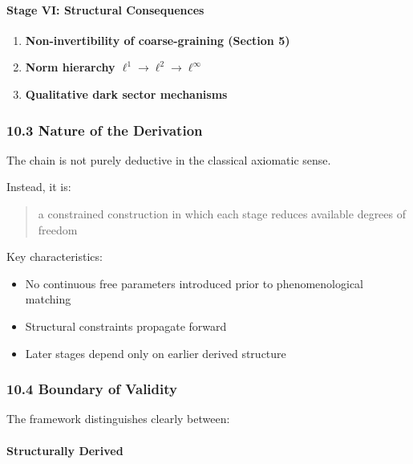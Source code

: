 \documentclass[
]{article}
\providecommand{\tightlist}{%
  \setlength{\itemsep}{0pt}\setlength{\parskip}{0pt}}
\begin{document}
\paragraph{Stage VI: Structural
Consequences}\label{stage-vi-structural-consequences}

\begin{enumerate}
\def\labelenumi{\arabic{enumi}.}
\setcounter{enumi}{16}
\tightlist
\item
  \textbf{Non-invertibility of coarse-graining (Section 5)}
\item
  \textbf{Norm hierarchy \(\ell^1 \to \ell^2 \to \ell^\infty\)}
\item
  \textbf{Qualitative dark sector mechanisms}
\end{enumerate}

\subsubsection{10.3 Nature of the
Derivation}\label{nature-of-the-derivation}

The chain is not purely deductive in the classical axiomatic sense.

Instead, it is:

\begin{quote}
a constrained construction in which each stage reduces available degrees
of freedom
\end{quote}

Key characteristics:

\begin{itemize}
\tightlist
\item
  No continuous free parameters introduced prior to phenomenological
  matching
\item
  Structural constraints propagate forward
\item
  Later stages depend only on earlier derived structure
\end{itemize}

\subsubsection{10.4 Boundary of Validity}\label{boundary-of-validity}

The framework distinguishes clearly between:

\paragraph{Structurally Derived}\label{structurally-derived}
\end{document}
